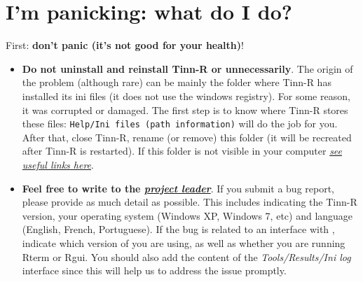 
\section{I'm panicking: what do I do?}

First: \textbf{don't panic (it's not good for your health)}!

\begin{itemize}
\item \textbf{Do not uninstall and reinstall Tinn-R or \RR{} unnecessarily}.
  The origin of the problem (although rare) can be mainly the folder where Tinn-R has installed its ini files
  (it does not use the windows registry). For some reason, it was corrupted or damaged.
  The first step is to know where Tinn-R stores these files: \texttt{Help/Ini files (path information)}
  will do the job for you. After that, close Tinn-R,
  rename (or remove) this folder (it will be recreated after Tinn-R is restarted).
  If this folder is not visible in your computer \textit{\href{\#faq\_trpaths}{see useful links here}}.
\item \textbf{Feel free to write to the \textit{\href{mailto:joseclaudio.faria@gmail.com}{project leader}}}.
  If you submit a bug report, please provide as much detail as possible.
  This includes indicating the Tinn-R version, your operating system (Windows XP, Windows 7, etc) and
  language (English, French, Portuguese). If the bug is related to an interface with \RR{},
  indicate which version of \RR{} you are using, as well as whether you are running Rterm or Rgui.
  You should also add the content of the \textit{Tools/Results/Ini log}
  interface since this will help us to address the issue promptly.
\end{itemize}
